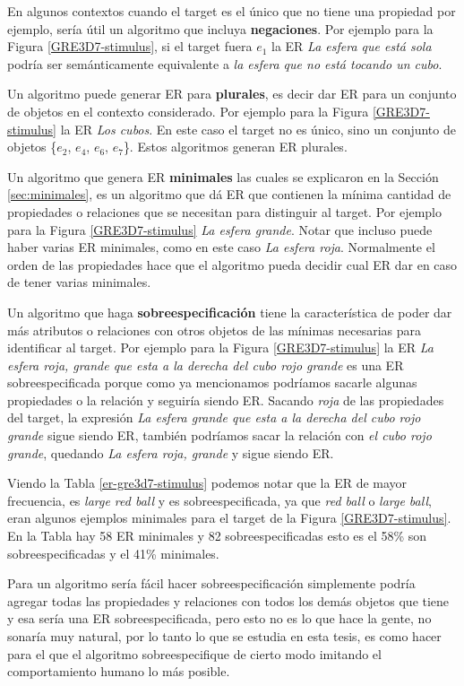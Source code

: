 En algunos contextos cuando el target es el \'unico que no tiene una propiedad por ejemplo, ser\'ia \'util un algoritmo que incluya {\bf negaciones}. Por ejemplo para la Figura \ref{GRE3D7-stimulus}, si el target fuera $e_1$ la ER {\it La esfera que est\'a sola} podr\'ia ser sem\'anticamente equivalente a {\it la esfera que no est\'a tocando un cubo}.

Un algoritmo puede generar ER para {\bf plurales}, es decir dar ER para un conjunto de objetos en el contexto considerado. Por ejemplo para la Figura \ref{GRE3D7-stimulus} la ER {\it Los cubos}. En este caso el target no es \'unico, sino un conjunto de objetos \{$e_2$, $e_4$, $e_6$, $e_7$\}. Estos algoritmos generan ER plurales.

Un algoritmo que genera ER {\bf minimales} las cuales se explicaron en la Secci\'on \ref{sec:minimales}, es un algoritmo que d\'a ER que contienen la m\'inima cantidad de propiedades o relaciones que se necesitan para distinguir al target.  Por ejemplo para la Figura \ref{GRE3D7-stimulus} {\it La esfera grande}. Notar que incluso puede haber varias ER minimales, como en este caso {\it La esfera roja}. Normalmente el orden de las propiedades hace que el algoritmo pueda decidir cual ER dar en caso de tener varias minimales.

Un algoritmo que haga {\bf sobreespecificaci\'on} tiene la caracter\'istica de poder dar m\'as atributos o relaciones con otros objetos de las m\'inimas necesarias para identificar al target. Por ejemplo para la Figura \ref{GRE3D7-stimulus} la ER {\it La esfera roja, grande que esta a la derecha del cubo rojo grande} es una ER sobreespecificada porque como ya mencionamos podr\'iamos sacarle algunas propiedades o la relaci\'on y seguir\'ia siendo ER. Sacando {\it roja} de las propiedades del target, la expresi\'on {\it La esfera grande que esta a la derecha del cubo rojo grande} sigue siendo ER, tambi\'en podr\'iamos sacar la relaci\'on con {\it el cubo rojo grande}, quedando {\it La esfera roja, grande} y sigue siendo ER.

Viendo la Tabla \ref{er-gre3d7-stimulus} podemos notar que la ER de mayor frecuencia, es {\it large red ball} y es sobreespecificada, ya que {\it red ball} o {\it large ball}, eran algunos ejemplos minimales para el target de la Figura \ref{GRE3D7-stimulus}. En la Tabla hay 58 ER minimales y 82 sobreespecificadas esto es el 58\% son sobreespecificadas y el 41\% minimales.

Para un algoritmo ser\'ia f\'acil hacer sobreespecificaci\'on simplemente podr\'ia agregar todas las propiedades y relaciones con todos los dem\'as objetos que tiene y esa ser\'ia una ER sobreespecificada, pero esto no es lo que hace la gente, no sonar\'ia muy natural, por lo tanto lo que se estudia en esta tesis, es como hacer para el que el algoritmo sobreespecifique de cierto modo imitando el comportamiento humano lo m\'as posible. 

